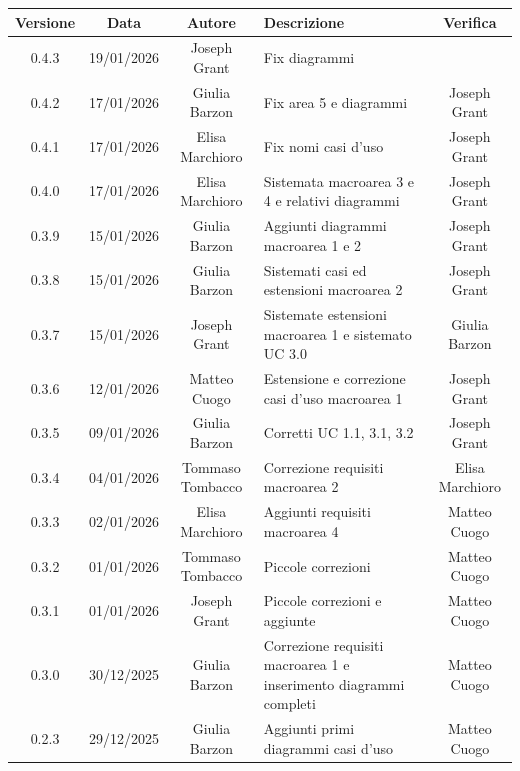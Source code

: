 \documentclass[11pt,a4paper]{article}
\begin{document}
\begin{table}[H]
    \centering
    \begin{tabular}{|c|c|c|>{\raggedright\arraybackslash}p{}|c|}
        \hline
        \textbf{Versione} & \textbf{Data} & \textbf{Autore} & \textbf{Descrizione} & \textbf{Verifica} \\
        \hline
        0.4.3 & 19/01/2026 & Joseph Grant & Fix diagrammi &  \\
        \hline
        0.4.2 & 17/01/2026 & Giulia Barzon & Fix area 5 e diagrammi & Joseph Grant \\
        \hline
        0.4.1 & 17/01/2026 & Elisa Marchioro & Fix nomi casi d'uso & Joseph Grant \\
        \hline
        0.4.0 & 17/01/2026 & Elisa Marchioro & Sistemata macroarea 3 e 4 e relativi diagrammi & Joseph Grant \\
        \hline
        0.3.9 & 15/01/2026 & Giulia Barzon & Aggiunti diagrammi macroarea 1 e 2 & Joseph Grant \\
        \hline
        0.3.8 & 15/01/2026 & Giulia Barzon & Sistemati casi ed estensioni macroarea 2 & Joseph Grant \\
        \hline
        0.3.7 & 15/01/2026 & Joseph Grant & Sistemate estensioni macroarea 1 e sistemato UC 3.0 & Giulia Barzon\\
        \hline
        0.3.6 & 12/01/2026 & Matteo Cuogo & Estensione e correzione casi d'uso macroarea 1 & Joseph Grant\\
        \hline
        0.3.5 & 09/01/2026 & Giulia Barzon & Corretti UC 1.1, 3.1, 3.2 & Joseph Grant\\
        \hline
        0.3.4 & 04/01/2026 & Tommaso Tombacco & Correzione requisiti macroarea 2 & Elisa Marchioro\\
        \hline
        0.3.3 & 02/01/2026 & Elisa Marchioro & Aggiunti requisiti macroarea 4 &  Matteo Cuogo\\
        \hline
        0.3.2 & 01/01/2026 & Tommaso Tombacco & Piccole correzioni & Matteo Cuogo\\
        \hline
        0.3.1 & 01/01/2026 & Joseph Grant & Piccole correzioni e aggiunte &  Matteo Cuogo\\
        \hline
        0.3.0 & 30/12/2025 & Giulia Barzon & Correzione requisiti macroarea 1 e inserimento diagrammi completi & Matteo Cuogo \\
        \hline
        0.2.3 & 29/12/2025 & Giulia Barzon & Aggiunti primi diagrammi casi d'uso &  Matteo Cuogo \\

\end{tabular}
\end{table}
\end{document}

